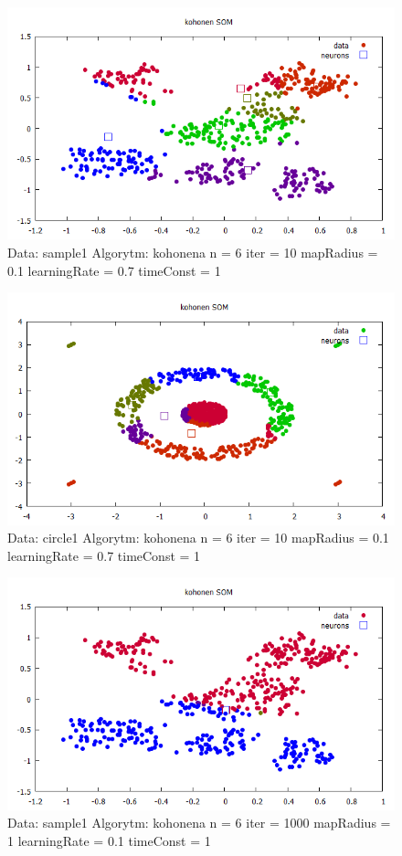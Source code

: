\documentclass{classrep}
\begin{document}
{{{\newpage

\begin{figure}[h!]
 \centering
 \includegraphics[width=12cm]{img/kohonensample1_6_10.png}
 \vspace{-0.3cm}
 \caption{Data: sample1 Algorytm: kohonena n = 6 iter = 10
  mapRadius = 0.1 learningRate = 0.7 timeConst = 1  
}
\end{figure}

\begin{figure}[h!]
\centering
 \includegraphics[width=12cm]{img/kohonencircle1_6_10.png}
 \vspace{-0.3cm}
 \caption{Data: circle1 Algorytm: kohonena n = 6 iter = 10
  mapRadius = 0.1 learningRate = 0.7 timeConst = 1  
}
\end{figure}

\newpage

\begin{figure}[h!]
\centering
 \includegraphics[width=12cm]{img/kohonensample1_6_1000.png}
 \vspace{-0.3cm}
 \caption{Data: sample1 Algorytm: kohonena n = 6 iter = 1000
  mapRadius = 1 learningRate = 0.1 timeConst = 1  
}
\end{figure}

}}}
\end{document}
